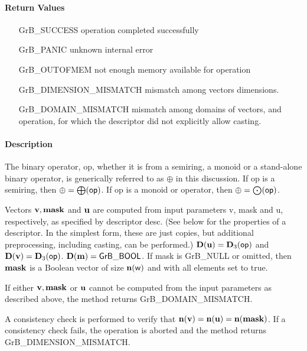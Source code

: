 \paragraph{Return Values}

\begin{itemize}[leftmargin=2.1in]
\item[{\sf GrB\_SUCCESS}]             operation completed successfully
\item[{\sf GrB\_PANIC}]               unknown internal error
\item[{\sf GrB\_OUTOFMEM}]            not enough memory available for operation
\item[{\sf GrB\_DIMENSION\_MISMATCH}] mismatch among vectors dimensions.
\item[{\sf GrB\_DOMAIN\_MISMATCH}]    mismatch among domains of vectors, and operation, for which the descriptor did not explicitly allow casting.
\end{itemize}

\paragraph{Description}

The binary operator, {\sf op}, whether it is from a semiring, a monoid or a stand-alone binary operator,
is generically referred to as $\oplus$ in this discussion.
If {\sf op} is a semiring, then $\oplus = \bigoplus({\sf op})$. 
If {\sf op} is a monoid or operator, then $\oplus = \bigodot({\sf op})$.

Vectors ${\bf v}, {\bf mask}$ and ${\bf u}$ are computed from
input parameters {\sf v}, {\sf mask} and {\sf u}, respectively, as specified
by descriptor {\sf desc}. (See below for the properties of a descriptor. In
the simplest form, these are just copies, but additional preprocessing,
including casting, can be performed.)  $\bold{D}({\bf u}) =
\bold{D}_3({\sf op})$ and $\bold{D}({\bf v}) = \bold{D}_3({\sf op})$.
$\bold{D}({\bf m}) = {\sf GrB\_BOOL}$.  If {\sf mask} is {\sf GrB\_NULL} or omitted,
then ${\bf mask}$ is a Boolean vector of size $\bold{n}({\bf \sf w})$
and with all elements set to {\sf true}.

If either ${\bf v}, {\bf mask}$ or ${\bf u}$ cannot be computed
from the input parameters as described above, the method returns {\sf
GrB\_DOMAIN\_MISMATCH}.

A consistency check is performed to verify that $\bold{n}({\bf v})
= \bold{n}({\bf u}) = \bold{n}({\bf mask})$. If a consistency check fails, the operation is
aborted and the method returns {\sf GrB\_DIMENSION\_MISMATCH}.

